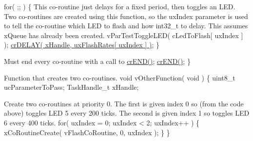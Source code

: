 \begin{DoxyPre}     for( ;; )
     \{
This co-routine just delays for a fixed period, then toggles
an LED.  Two co-routines are created using this function, so
the uxIndex parameter is used to tell the co-routine which
LED to flash and how int32\_t to delay.  This assumes xQueue has
already been created.
         vParTestToggleLED( cLedToFlash[ uxIndex ] );
         \hyperlink{croutine_8h_a05a06feb11028f2d1d440ea335f562ba}{crDELAY( xHandle, uxFlashRates[ uxIndex ] )};
     \}\end{DoxyPre}



\begin{DoxyPre}Must end every co-routine with a call to \hyperlink{croutine_8h_ae6038cc976689b50000475ebfc4e2f23}{crEND()};
     \hyperlink{croutine_8h_ae6038cc976689b50000475ebfc4e2f23}{crEND()};
 \}\end{DoxyPre}



\begin{DoxyPre}Function that creates two co-routines.
 void vOtherFunction( void )
 \{
 uint8\_t ucParameterToPass;
 TaskHandle\_t xHandle;\end{DoxyPre}



\begin{DoxyPre}Create two co-routines at priority 0.  The first is given index 0
so (from the code above) toggles LED 5 every 200 ticks.  The second
is given index 1 so toggles LED 6 every 400 ticks.
     for( uxIndex = 0; uxIndex < 2; uxIndex++ )
     \{
         xCoRoutineCreate( vFlashCoRoutine, 0, uxIndex );
     \}
 \}
   \end{DoxyPre}
 